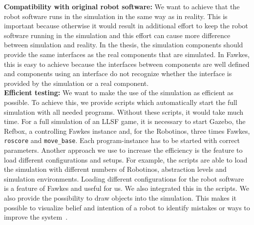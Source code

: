 \textbf{Compatibility with original robot software:} We want to achieve that the robot software runs in the simulation in the same way as in reality. This is important because otherwise it would result in additional effort to keep the robot software running in the simulation and this effort can cause more difference between simulation and reality. In the thesis, the simulation components should provide the same interfaces as the real components that are simulated. In Fawkes, this is easy to achieve because the interfaces between components are well defined and components using an interface do not recognize whether the interface is provided by the simulation or a real component.\\
\textbf{Efficient testing:} We want to make the use of the simulation as efficient as possible. To achieve this, we provide scripts which automatically start the full simulation with all needed programs. Without these scripts, it would take much time. For a full simulation of an LLSF game, it is necessary to start Gazebo, the Refbox, a controlling Fawkes instance and, for the Robotinos, three times Fawkes, \texttt{roscore} and \texttt{move\_base}. Each program-instance has to be started with correct parameters.  Another approach we use to increase the efficiency is the feature to load different configurations and setups. For example, the scripts are able to load the simulation with different numbers of Robotinos, abstraction levels and simulation environments. Loading different configurations for the robot software is a feature of Fawkes and useful for us. We also integrated this in the scripts. We also provide the possibility to draw objects into the simulation. This makes it possible to visualize belief and intention of a robot to identify mistakes or ways to improve the system~\cite{Visualization}.\\
